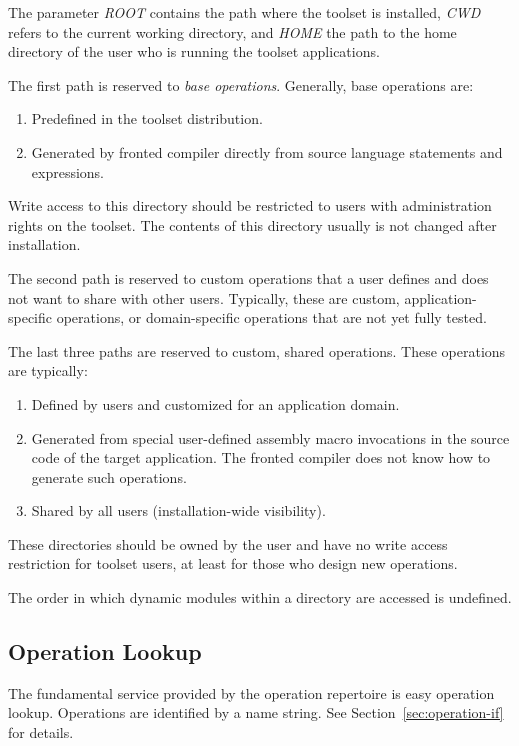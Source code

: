 \documentclass[twoside]{tce}
\begin{document}
The parameter \emph{ROOT} contains the path where the toolset is installed,
\emph{CWD} refers to the current working directory, and \emph{HOME} the path
to the home directory of the user who is running the toolset applications.

The first path is reserved to \emph{base operations}.  Generally, base
operations are:
\begin{enumerate}
\item %
  Predefined in the toolset distribution.
\item %
  Generated by fronted compiler directly from source language statements and
  expressions.
\end{enumerate}
Write access to this directory should be restricted to users with
administration rights on the toolset.  The contents of this directory
usually is not changed after installation.

The second path is reserved to custom operations that a user defines and
does not want to share with other users.  Typically, these are custom,
application-specific operations, or domain-specific operations that are not
yet fully tested.

The last three paths are reserved to custom, shared operations. These
operations are typically:
\begin{enumerate}
\item %
  Defined by users and customized for an application domain.
\item %
  Generated from special user-defined assembly macro invocations in the
  source code of the target application.  The fronted compiler does not know
  how to generate such operations.
\item %
  Shared by all users (installation-wide visibility).
\end{enumerate}

These directories should be owned by the user and have no write access
restriction for toolset users, at least for those who design new operations.

The order in which dynamic modules within a directory are accessed is
undefined.

\subsection{Operation Lookup}
\label{ssec:repertoire-lookup}

The fundamental service provided by the operation repertoire is easy
operation lookup.  Operations are identified by a name string.  See
Section~\ref{sec:operation-if} for details.
\end{document}
